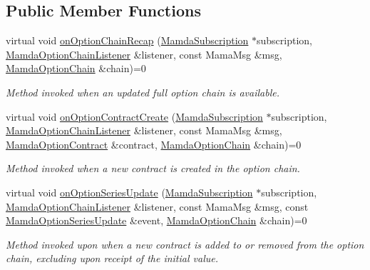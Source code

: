 \subsection*{Public Member Functions}
\begin{CompactItemize}
\item 
virtual void \hyperlink{classWombat_1_1MamdaOptionChainHandler_be6d7d71f55b09f40273a1ee5120f260}{on\-Option\-Chain\-Recap} (\hyperlink{classWombat_1_1MamdaSubscription}{Mamda\-Subscription} $\ast$subscription, \hyperlink{classWombat_1_1MamdaOptionChainListener}{Mamda\-Option\-Chain\-Listener} \&listener, const Mama\-Msg \&msg, \hyperlink{classWombat_1_1MamdaOptionChain}{Mamda\-Option\-Chain} \&chain)=0
\begin{CompactList}\small\item\em Method invoked when an updated full option chain is available. \item\end{CompactList}\item 
virtual void \hyperlink{classWombat_1_1MamdaOptionChainHandler_a3cfccdc231b70111443aa096cf9a606}{on\-Option\-Contract\-Create} (\hyperlink{classWombat_1_1MamdaSubscription}{Mamda\-Subscription} $\ast$subscription, \hyperlink{classWombat_1_1MamdaOptionChainListener}{Mamda\-Option\-Chain\-Listener} \&listener, const Mama\-Msg \&msg, \hyperlink{classWombat_1_1MamdaOptionContract}{Mamda\-Option\-Contract} \&contract, \hyperlink{classWombat_1_1MamdaOptionChain}{Mamda\-Option\-Chain} \&chain)=0
\begin{CompactList}\small\item\em Method invoked when a new contract is created in the option chain. \item\end{CompactList}\item 
virtual void \hyperlink{classWombat_1_1MamdaOptionChainHandler_0f2ed7a5229483349b2c26330a0afb03}{on\-Option\-Series\-Update} (\hyperlink{classWombat_1_1MamdaSubscription}{Mamda\-Subscription} $\ast$subscription, \hyperlink{classWombat_1_1MamdaOptionChainListener}{Mamda\-Option\-Chain\-Listener} \&listener, const Mama\-Msg \&msg, const \hyperlink{classWombat_1_1MamdaOptionSeriesUpdate}{Mamda\-Option\-Series\-Update} \&event, \hyperlink{classWombat_1_1MamdaOptionChain}{Mamda\-Option\-Chain} \&chain)=0
\begin{CompactList}\small\item\em Method invoked upon when a new contract is added to or removed from the option chain, excluding upon receipt of the initial value. \item\end{CompactList}\item 

\end{CompactItemize}
